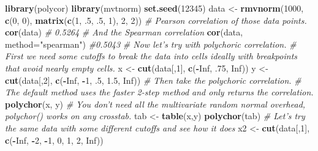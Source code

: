 \documentclass[
]{article}
\newenvironment{Shaded}{\begin{snugshade}}{\end{snugshade}}
\newcommand{\AttributeTok}[1]{\textcolor[rgb]{0.13,0.29,0.53}{#1}}
\newcommand{\CommentTok}[1]{\textcolor[rgb]{0.56,0.35,0.01}{\textit{#1}}}
\newcommand{\ConstantTok}[1]{\textcolor[rgb]{0.56,0.35,0.01}{#1}}
\newcommand{\DecValTok}[1]{\textcolor[rgb]{0.00,0.00,0.81}{#1}}
\newcommand{\FloatTok}[1]{\textcolor[rgb]{0.00,0.00,0.81}{#1}}
\newcommand{\FunctionTok}[1]{\textcolor[rgb]{0.13,0.29,0.53}{\textbf{#1}}}
\newcommand{\NormalTok}[1]{#1}
\newcommand{\OtherTok}[1]{\textcolor[rgb]{0.56,0.35,0.01}{#1}}
\newcommand{\SpecialCharTok}[1]{\textcolor[rgb]{0.81,0.36,0.00}{\textbf{#1}}}
\newcommand{\StringTok}[1]{\textcolor[rgb]{0.31,0.60,0.02}{#1}}
\begin{document}
\begin{Shaded}
\begin{Highlighting}[]
    \FunctionTok{library}\NormalTok{(polycor)}
    \FunctionTok{library}\NormalTok{(mvtnorm)}
    \FunctionTok{set.seed}\NormalTok{(}\DecValTok{12345}\NormalTok{)}
\NormalTok{    data }\OtherTok{\textless{}{-}} \FunctionTok{rmvnorm}\NormalTok{(}\DecValTok{1000}\NormalTok{, }\FunctionTok{c}\NormalTok{(}\DecValTok{0}\NormalTok{, }\DecValTok{0}\NormalTok{), }\FunctionTok{matrix}\NormalTok{(}\FunctionTok{c}\NormalTok{(}\DecValTok{1}\NormalTok{, .}\DecValTok{5}\NormalTok{, .}\DecValTok{5}\NormalTok{, }\DecValTok{1}\NormalTok{), }\DecValTok{2}\NormalTok{, }\DecValTok{2}\NormalTok{))}
    \CommentTok{\# Pearson correlation of those data points.}
    \FunctionTok{cor}\NormalTok{(data) }\CommentTok{\# 0.5264}
    \CommentTok{\# And the Spearman correlation  }
    \FunctionTok{cor}\NormalTok{(data, }\AttributeTok{method=}\StringTok{"spearman"}\NormalTok{) }\CommentTok{\#0.5043}
    \CommentTok{\# Now let’s try with polychoric correlation.}
    \CommentTok{\# First we need some cutoffs to break the data into cells ideally with breakpoints that avoid nearly empty cells.}
\NormalTok{    x }\OtherTok{\textless{}{-}} \FunctionTok{cut}\NormalTok{(data[,}\DecValTok{1}\NormalTok{], }\FunctionTok{c}\NormalTok{(}\SpecialCharTok{{-}}\ConstantTok{Inf}\NormalTok{, .}\DecValTok{75}\NormalTok{, }\ConstantTok{Inf}\NormalTok{))}
\NormalTok{    y }\OtherTok{\textless{}{-}} \FunctionTok{cut}\NormalTok{(data[,}\DecValTok{2}\NormalTok{], }\FunctionTok{c}\NormalTok{(}\SpecialCharTok{{-}}\ConstantTok{Inf}\NormalTok{, }\SpecialCharTok{{-}}\DecValTok{1}\NormalTok{, .}\DecValTok{5}\NormalTok{, }\FloatTok{1.5}\NormalTok{, }\ConstantTok{Inf}\NormalTok{))}
    \CommentTok{\# Then take the polychoric correlation.}
    \CommentTok{\# The default method uses the faster 2{-}step method and only returns the correlation.}
    \FunctionTok{polychor}\NormalTok{(x, y)}
    \CommentTok{\# You don’t need all the multivariate random normal overhead, polychor() works on any crosstab.}
\NormalTok{    tab }\OtherTok{\textless{}{-}} \FunctionTok{table}\NormalTok{(x,y)    }
    \FunctionTok{polychor}\NormalTok{(tab)}
    \CommentTok{\# Let’s try the same data with some different cutoffs and see how it does}
\NormalTok{    x2 }\OtherTok{\textless{}{-}} \FunctionTok{cut}\NormalTok{(data[,}\DecValTok{1}\NormalTok{], }\FunctionTok{c}\NormalTok{(}\SpecialCharTok{{-}}\ConstantTok{Inf}\NormalTok{, }\SpecialCharTok{{-}}\DecValTok{2}\NormalTok{, }\SpecialCharTok{{-}}\DecValTok{1}\NormalTok{, }\DecValTok{0}\NormalTok{, }\DecValTok{1}\NormalTok{, }\DecValTok{2}\NormalTok{, }\ConstantTok{Inf}\NormalTok{))}

\end{Highlighting}
\end{Shaded}
\end{document}

